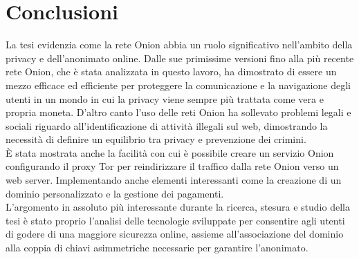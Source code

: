 \chapter{Conclusioni}

La tesi evidenzia come la rete Onion abbia un ruolo significativo nell'ambito della privacy e dell'anonimato online. 
Dalle sue primissime versioni fino alla più recente rete Onion, che è stata analizzata in questo lavoro, ha dimostrato di essere un mezzo efficace ed efficiente per proteggere la comunicazione e la navigazione degli utenti in un mondo in cui la privacy viene sempre più trattata come vera e propria moneta.
D'altro canto l'uso delle reti Onion ha sollevato problemi legali e sociali riguardo all'identificazione di attività illegali sul web, dimostrando la necessità di definire un equilibrio tra privacy e prevenzione dei crimini.
\\

È stata mostrata anche la facilità con cui è possibile creare un servizio Onion configurando il proxy Tor per reindirizzare il traffico dalla rete Onion verso un web server. 
Implementando anche elementi interessanti come la creazione di un dominio personalizzato e la gestione dei pagamenti.
\\

L'argomento in assoluto più interessante durante la ricerca, stesura e studio della tesi è stato proprio l'analisi delle tecnologie sviluppate per consentire agli utenti di godere di una maggiore sicurezza online, assieme all'associazione del dominio alla coppia di chiavi asimmetriche necessarie per garantire l'anonimato. 


